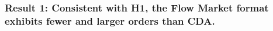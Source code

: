 

\subsubsection*{Result 1: 
Consistent with H1, the Flow Market format exhibits fewer and larger orders than CDA.}

